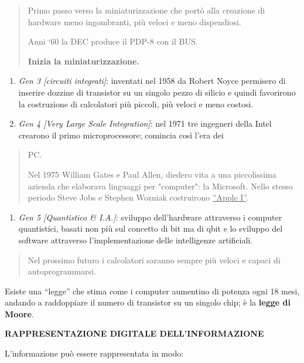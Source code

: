 \begin{quote}
Primo passo verso la miniaturizzazione che portò alla creazione di
hardware meno ingombranti, più veloci e meno dispendiosi.

Anni `60 la DEC produce il PDP-8 con il BUS.

\textbf{Inizia la miniaturizzazione.}
\end{quote}

\begin{enumerate}
\def\labelenumi{\arabic{enumi}.}
\setcounter{enumi}{3}
\item
  \emph{Gen 3 {[}circuiti integrati{]}}: inventati nel 1958 da Robert
  Noyce permisero di inserire dozzine di transistor su un singolo pezzo
  di silicio e quindi favorirono la costruzione di calcolatori più
  piccoli, più veloci e meno costosi.
\item
  \emph{Gen 4 {[}Very Large Scale Integration{]}}: nel 1971 tre
  ingegneri della Intel crearono il primo microprocessore; comincia così
  l'era dei
\end{enumerate}

\begin{quote}
PC.

Nel 1975 William Gates e Paul Allen, diedero vita a una piccolissima
azienda che elaborava linguaggi per "computer": la Microsoft. Nello
stesso periodo Steve Jobs e Stephen Wozniak costruirono \ul{''Apple
I''}.
\end{quote}

\begin{enumerate}
\def\labelenumi{\arabic{enumi}.}
\setcounter{enumi}{5}
\item
  \emph{Gen 5 {[}Quantistico \& I.A.{]}}: sviluppo dell'hardware
  attraverso i computer quantistici, basati non più sul concetto di bit
  ma di qbit e lo sviluppo del software attraverso l'implementazione
  delle intelligenze artificiali.
\end{enumerate}

\begin{quote}
Nel prossimo futuro i calcolatori saranno sempre più veloci e capaci di
autoprogrammarsi.
\end{quote}

Esiste una ``legge'' che stima come i computer aumentino di potenza ogni
18 mesi, andando a raddoppiare il numero di transistor su un singolo
chip; è la \textbf{legge di Moore}.

\textbf{RAPPRESENTAZIONE DIGITALE DELL'INFORMAZIONE}

L'informazione può essere rappresentata in modo:

